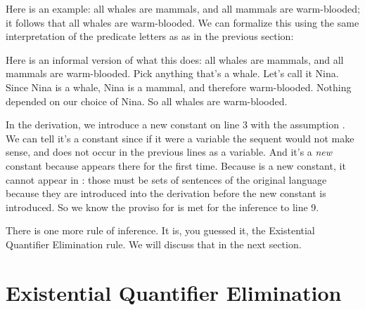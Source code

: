 Here is an example: all whales are mammals, and all mammals are warm-blooded; it 
follows that all whales are warm-blooded. We can formalize this using the same 
interpretation of the predicate letters as as in the previous section:

\begin{argumentN}[1]










\end{argumentN}



Here is an informal version of what this does: all whales are mammals, and all 
mammals are warm-blooded. Pick anything that's a whale. Let's call it Nina.  
Since Nina is a whale, Nina is a mammal, and therefore warm-blooded. Nothing 
depended on our choice of Nina. So all whales are warm-blooded.

In the derivation, we introduce a new constant  on line 3 with the 
assumption . We can tell it's a constant since if it were a 
variable the sequent would not make sense, and  does not occur in the 
previous lines as a variable. And it's a \emph{new} constant because  
appears there for the first time. Because  is a new constant, it cannot 
appear in \p{\Gamma,\Delta}: those must be sets of sentences of the original 
language because they are introduced into the derivation before the new constant 
is introduced.  So we know the proviso for \uniI{} is met for the inference to 
line 9.

There is one more rule of inference. It is, you guessed it, the Existential 
Quantifier Elimination rule. We will discuss that in the next section. 


\section{Existential Quantifier Elimination}


